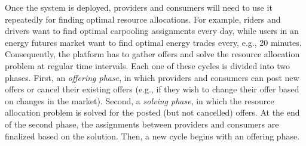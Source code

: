Once the system is deployed,
providers and consumers will need to use it repeatedly for finding optimal resource allocations. 
For example, riders and drivers want to find optimal carpooling assignments every day, while users in an energy futures market want to find optimal energy trades every, e.g., 20 minutes.
Consequently, the platform has to gather offers and solve the resource allocation problem at regular time intervals.
Each one of these cycles is divided into two phases.
First, an \emph{offering phase}, in which providers and consumers can post new offers or cancel their existing offers (e.g., if they wish to change their offer based on changes in the market).
Second, a \emph{solving phase}, in which the resource allocation problem is solved for the posted (but not cancelled) offers.
At the end of the second phase, the assignments between providers and consumers are finalized based on the solution.
Then, a new cycle begins with an offering phase.


